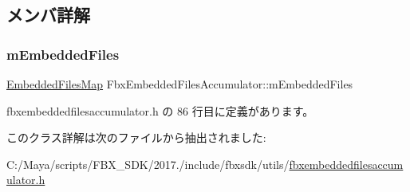 \subsection{メンバ詳解}
\mbox{\label{class_fbx_embedded_files_accumulator_a41e3d4c6054110af6df9a53066634dc8}} 
\subsubsection{\texorpdfstring{m\+Embedded\+Files}{mEmbeddedFiles}}
{\footnotesize\ttfamily \hyperlink{class_fbx_embedded_files_accumulator_a7471092a2496b1e45a263f91ea3db731}{Embedded\+Files\+Map} Fbx\+Embedded\+Files\+Accumulator\+::m\+Embedded\+Files}



 fbxembeddedfilesaccumulator.\+h の 86 行目に定義があります。



このクラス詳解は次のファイルから抽出されました\+:\begin{DoxyCompactItemize}
\item 
C\+:/\+Maya/scripts/\+F\+B\+X\+\_\+\+S\+D\+K/2017./include/fbxsdk/utils/\hyperlink{fbxembeddedfilesaccumulator_8h}{fbxembeddedfilesaccumulator.\+h}\end{DoxyCompactItemize}
